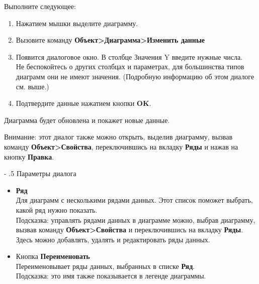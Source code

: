 ﻿\documentclass[a4paper,10pt]{article}
\makeatletter
\renewcommand\paragraph{%
   \@startsection{paragraph}{4}{0mm}%
      {-\baselineskip}%
      {.5\baselineskip}%
      {\normalfont\normalsize\bfseries}}
\makeatother
\begin{document}
Выполните следующее:
\begin{enumerate}
 \item Нажатием мышки выделите диаграмму.
 \item Вызовите команду \textbf{Объект>Диаграмма>Изменить данные}
 \item Появится диалоговое окно. В столбце Значения Y введите нужные числа.\\
Не беспокойтесь о других столбцах и параметрах, для большинства типов диаграмм они не имеют значения. (Подробную информацию об этом диалоге см. выше.)
\item Подтвердите данные нажатием кнопки \textbf{OK}.
\end{enumerate}

Диаграмма будет обновлена и покажет новые данные.

Внимание: этот диалог также можно открыть, выделив диаграмму, вызвав команду \textbf{Объект>Свойства}, переключившись на вкладку \textbf{Ряды} и нажав на кнопку \textbf{Правка}.

\paragraph{Параметры диалога}
\begin{itemize}
 \item \textbf{Ряд}\\
 Для диаграмм с несколькими рядами данных. Этот список поможет выбрать, какой ряд нужно показать. \\
 Подсказка: управлять рядами данных в диаграмме можно, выбрав диаграмму, вызвав команду \textbf{Объект>Свойства} и переключившись на вкладку \textbf{Ряды}. Здесь можно добавлять, удалять и редактировать ряды данных.
 \item Кнопка \textbf{Переименовать}\\
 Переименовывает ряды данных, выбранных в списке \textbf{Ряд}.\\
 Подсказка: это имя также показывается в легенде диаграммы.
\end{itemize}
\end{document}

